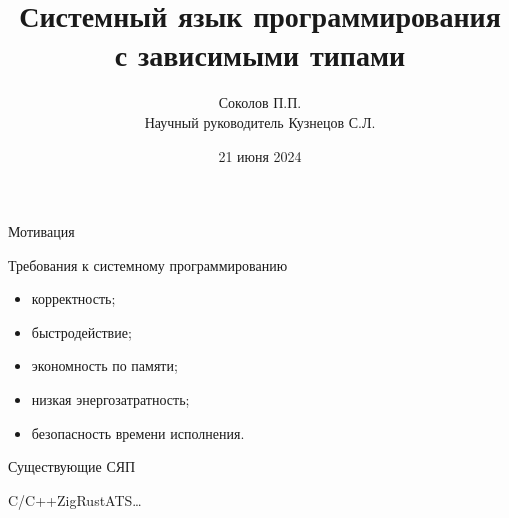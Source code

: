 \documentclass{beamer}
\title[DTSPL]{Системный язык программирования с зависимыми типами}
\author[Соколов П.П.]{Соколов П.П.\texorpdfstring{\\[0.3em]}{}
  {\small Научный руководитель Кузнецов С.Л.}}
\institute{МФТИ}
\date{21 июня 2024}
\begin{document}
\frame{\titlepage}

\begin{frame}{Мотивация}
  \begin{block}{Требования к системному программированию}
    \begin{minipage}[t]{0.48\linewidth}
    \begin{itemize}
      \item корректность;
      \item быстродействие;
      \item экономность по памяти;
    \end{itemize} 
    \end{minipage}
    \begin{minipage}[t]{0.48\linewidth}
    \begin{itemize}
      \item низкая энергозатратность;
      \item безопасность времени исполнения.
    \end{itemize}
    \end{minipage}
  \end{block}
  \begin{block}{Существующие СЯП}
  \begin{center}
  C/C++\qquad Zig\qquad Rust\qquad ATS\qquad \ldots
  \end{center}
  \end{block}
\end{frame}
\end{document}
